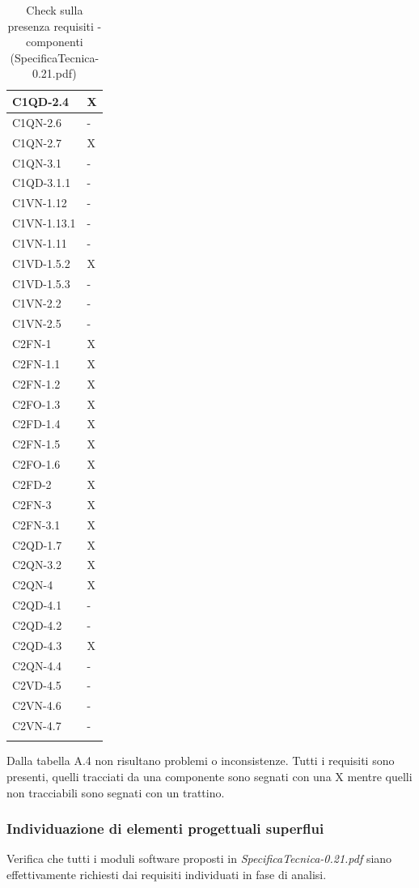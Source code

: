 \begin{footnotesize}
\begin{longtable}{|p{}|p{}|}
 C1QD-2.4&X  \\ \hline
 C1QN-2.6&-  \\ \hline
 C1QN-2.7&X    \\ \hline
 C1QN-3.1&-   \\ \hline
 C1QD-3.1.1&-    \\ \hline
 C1VN-1.12&- \\ \hline
 C1VN-1.13.1&-  \\ \hline
 C1VN-1.11&-  \\ \hline
 C1VD-1.5.2&X \\ \hline
 C1VD-1.5.3&-   \\ \hline
 C1VN-2.2&- \\ \hline
 C1VN-2.5&-  \\ \hline
 C2FN-1&X    \\ \hline
 C2FN-1.1&X    \\ \hline
 C2FN-1.2&X   \\ \hline
 C2FO-1.3&X    \\ \hline
 C2FD-1.4&X   \\ \hline
 C2FN-1.5&X   \\ \hline
 C2FO-1.6&X   \\ \hline
 C2FD-2&X    \\ \hline
 C2FN-3&X   \\ \hline
 C2FN-3.1&X   \\ \hline
 C2QD-1.7&X   \\ \hline
 C2QN-3.2&X   \\ \hline
 C2QN-4 &X  \\ \hline
 C2QD-4.1&-    \\ \hline
 C2QD-4.2&-   \\ \hline
 C2QD-4.3&X   \\ \hline
 C2QN-4.4&-  \\ \hline
 C2VD-4.5&-   \\ \hline
 C2VN-4.6&-    \\ \hline
 C2VN-4.7&-  \\ \hline

\caption{Check sulla presenza requisiti - componenti
(SpecificaTecnica-0.21.pdf)}
\end{longtable}
\end{footnotesize}

Dalla tabella A.4 non risultano problemi o inconsistenze. Tutti i requisiti sono
presenti, quelli tracciati da una componente sono segnati con una X mentre
quelli non tracciabili sono segnati con un trattino.

\subsubsection*{Individuazione di elementi progettuali superflui}
Verifica che tutti i moduli software proposti in
\emph{SpecificaTecnica-0.21.pdf} siano effettivamente richiesti dai requisiti
individuati in fase di analisi.


